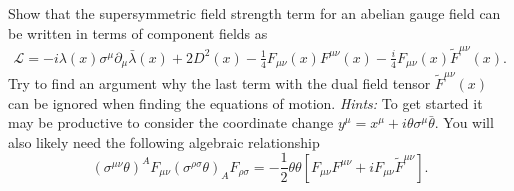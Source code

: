 \documentclass[notes.tex]{subfiles}
\begin{document}
\begin{Exercise}[]
\label{ex:abelian_field_strength}
Show that the supersymmetric field strength term for an abelian gauge field can be written in terms of component fields as
\begin{eqnarray}
\mathcal L = -i\lambda(x)\sigma^\mu \partial_\mu \bar\lambda(x)+2D^2(x)-\frac{1}{4}F_{\mu\nu}(x)F^{\mu\nu}(x) -\frac{i}{4}F_{\mu\nu}(x)\tilde F^{\mu\nu}(x).
\end{eqnarray}
Try to find an argument why the last term with the dual field tensor $\tilde F^{\mu\nu}(x)$ can be ignored when finding the equations of motion.  {\it Hints:} To get started it may be productive to consider the coordinate change $y^\mu=x^\mu + i\theta\sigma^\mu\bar\theta$. You will also likely need the following algebraic relationship
\begin{equation}
(\sigma^{\mu\nu}\theta)^A F_{\mu\nu} (\sigma^{\rho\sigma}\theta)_A F_{\rho\sigma}  = -\frac{1}{2}\theta\theta [F_{\mu\nu}F^{\mu\nu} + iF_{\mu\nu}\tilde F^{\mu\nu}].
\end{equation}
\end{Exercise}
\end{document}

